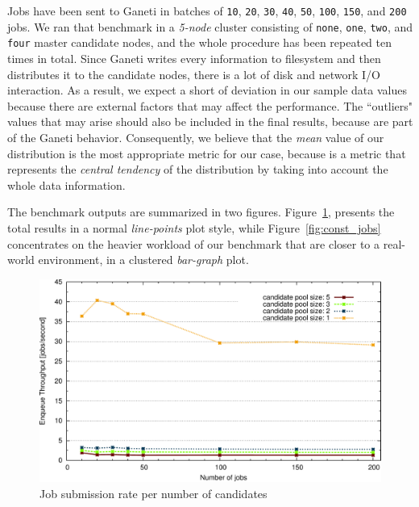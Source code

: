Jobs have been sent to Ganeti in batches of \texttt{10}, \texttt{20},
\texttt{30}, \texttt{40}, \texttt{50}, \texttt{100}, \texttt{150}, and
\texttt{200} jobs. We ran that benchmark in a \emph{5-node} cluster consisting
of \texttt{none},
\texttt{one}, \texttt{two}, and \texttt{four} master candidate nodes, and the
whole procedure has been repeated ten times in total. Since Ganeti writes every
information to filesystem and then distributes it to the candidate nodes, there
is a lot of disk and network I/O interaction. As a result, we expect a short of
deviation in our sample data values because there are external factors that may
affect the performance. The ``outliers" values that may arise should also be
included in the final results, because are part of the Ganeti behavior.
Consequently, we believe that the \emph{mean} value of our distribution is the
most appropriate metric for our case, because is a metric that represents the
\emph{central tendency} of the distribution by taking into account the whole
data information.

The benchmark outputs are summarized in two figures. Figure~\ref{fig:mc_comp},
presents the total results in a normal \emph{line-points} plot style, while
Figure~\ref{fig:const_jobs} concentrates on the heavier workload of our
benchmark that are closer to a real-world environment, in a clustered
\emph{bar-graph} plot.

\begin{figure}[htbp]
  \begin{center}
    \includegraphics[width=1.0\maxwidth]{../figures/mc_comp.pdf}
    \caption{Job submission rate per number of candidates}
    \label{fig:mc_comp}
  \end{center}
\end{figure}

